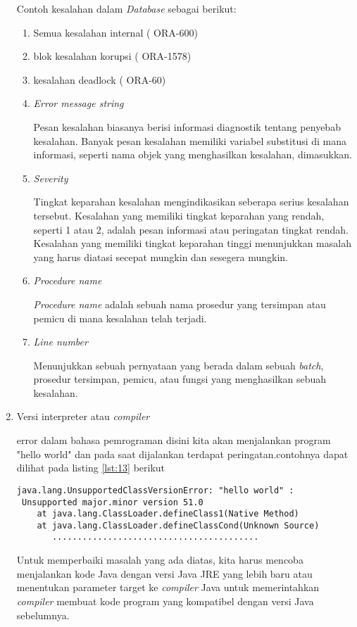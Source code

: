 \begin{enumerate}
Contoh kesalahan dalam \textit{Database} sebagai berikut:
\begin{enumerate}
\item Semua kesalahan internal ( ORA-600)
\item blok kesalahan korupsi ( ORA-1578)
\item kesalahan deadlock ( ORA-60) 
\item \textit{Error message string}
\par 
Pesan kesalahan biasanya berisi informasi diagnostik tentang penyebab kesalahan. Banyak pesan kesalahan memiliki variabel substitusi di mana informasi, seperti nama objek yang menghasilkan kesalahan, dimasukkan.
\item \textit{Severity}
\par 
Tingkat keparahan kesalahan mengindikasikan seberapa serius kesalahan tersebut. Kesalahan yang memiliki tingkat keparahan yang rendah, seperti 1 atau 2, adalah pesan informasi atau peringatan tingkat rendah. Kesalahan yang memiliki tingkat keparahan tinggi menunjukkan masalah yang harus diatasi secepat mungkin dan sesegera mungkin.
\item \textit{Procedure name}
\par 
\textit{Procedure name} adalah sebuah nama prosedur yang tersimpan atau pemicu di mana kesalahan telah terjadi.
\item \textit{Line number}
\par 
Menunjukkan sebuah pernyataan yang berada dalam sebuah \textit{batch}, prosedur tersimpan, pemicu, atau fungsi yang menghasilkan sebuah kesalahan.
\end{enumerate}
\item Versi interpreter atau \textit{compiler}
\par 
error dalam bahasa pemrograman disini kita akan menjalankan program "hello world" dan pada saat dijalankan terdapat peringatan.contohnya dapat dilihat pada listing \ref{lst:13} berikut

\begin{lstlisting}[caption=Contoh commit standar,label={lst:13}]
java.lang.UnsupportedClassVersionError: "hello world" :
 Unsupported major.minor version 51.0
    at java.lang.ClassLoader.defineClass1(Native Method)
    at java.lang.ClassLoader.defineClassCond(Unknown Source)
       .........................................
\end{lstlisting}
Untuk memperbaiki masalah yang ada diatas, kita harus mencoba menjalankan kode Java dengan versi Java JRE yang lebih baru atau menentukan parameter target ke \textit{compiler} Java untuk memerintahkan \textit{compiler} membuat kode program yang kompatibel dengan versi Java sebelumnya.
\end{enumerate}